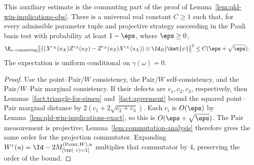 \begin{lemma}
	\label{lem:qld-point-obs-commuting-estimate}
	\leanok
	This auxiliary estimate is the commuting part of the proof of
	Lemma~\ref{lem:qld-win-implications-obs}.
	There is a universal real constant $C\geq1$ such that, for every
	admissible parameter tuple and projective strategy succeeding in the
	Pauli basis test with probability at least $1-\eps$, where $\eps\geq0$,
	\[
	\E_{\omega\text{ commuting}}
	\big\|\big((X^{r_X}(u_X)Z^{r_Z}(u_Z)
	 -Z^{r_Z}(u_Z)X^{r_X}(u_X))\otimes\Id_B\big)\ket{\psi}\big\|^2
	\leq C(\eps+\sqrt\eps).
	\]
	The expectation is uniform conditional on $\gamma(\omega)=0$.
\end{lemma}
\begin{proof}
	\leanok
	Use the point--$\mathrm{Pair}/W$ consistency, the
	$\mathrm{Pair}/W$ self-consistency, and the
	$\mathrm{Pair}/W$--$\mathrm{Pair}$ marginal consistency.
	If their defects are $c_1,c_2,c_3$, respectively, then
	Lemmas~\ref{fact:triangle-for-simeq} and~\ref{fact:agreement} bound
	the squared point--$\mathrm{Pair}$ marginal distance by
	$2(c_1+2\sqrt{c_2+c_3})$. Each $c_i$ is $O(\eps)$ by
	Lemma~\ref{lem:qld-win-implications-exact}, so this is
	$O(\eps+\sqrt\eps)$. The $\mathrm{Pair}$ measurement is projective;
	Lemma~\ref{lem:commutation-analysis} therefore gives the same order
	for the projection commutator. Expanding
	$W^r(u)=\Id-2M^{(\mathrm{Point},W),u}_{[\tr(\cdot\,r)=1]}$
	multiplies that commutator by $4$, preserving the order of the bound.
\end{proof}

